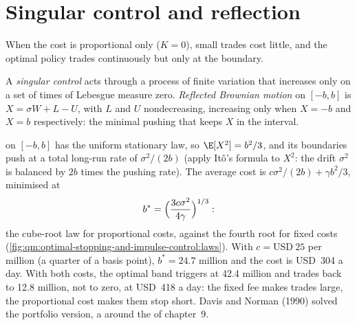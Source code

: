 \section{Singular control and reflection}

When the cost is proportional only ($K = 0$), small trades cost little, and the optimal policy trades continuously but only
at the boundary.

\begin{definition}\label{def:qm:optimal-stopping-and-impulse-control:singular}
A \emph{singular control} acts through a process of finite variation that increases only on a set
of times of Lebesgue measure zero. \emph{Reflected Brownian motion} on $[-b, b]$ is $X =
\sigma W + L - U$, with $L$ and $U$ nondecreasing, increasing only when $X = -b$ and $X = b$ respectively: the minimal pushing that
keeps $X$ in the interval.
\end{definition}

 on $[-b, b]$ has the uniform stationary law, so $\E[X^2] = b^2/3$, and its boundaries push at a total
long-run rate of $\sigma^2/(2b)$ (apply Itô's formula to $X^2$: the drift $\sigma^2$ is balanced by $2b$ times the pushing rate). The
average cost is $c\sigma^2/(2b) + \gamma b^2/3$, minimised at
\[
b^* = \Bigl(\frac{3c\sigma^2}{4\gamma}\Bigr)^{1/3}:
\]
the cube-root law for proportional costs, against the fourth root for fixed costs
(\cref{fig:qm:optimal-stopping-and-impulse-control:laws}). With $c = \text{USD}~25$ per million (a quarter of a basis point),
$b^* = 24.7$ million and the cost is USD~304 a day. With both costs, the optimal band triggers at 42.4 million and trades back
to 12.8 million, not to zero, at USD~418 a day: the fixed fee makes trades large, the proportional cost makes them stop short.
Davis and Norman (1990) solved the portfolio version, a  around the  of chapter~9.

